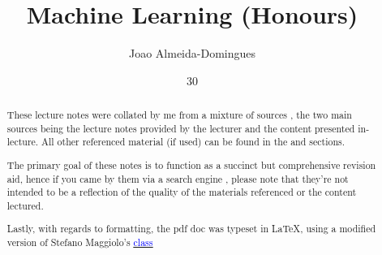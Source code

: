 \documentclass[english,course]{Notes}
\title{Machine Learning (Honours)}
\author{Joao Almeida-Domingues}
\date{30}{09}{2020}
\begin{document}

\begin{abstract}
	\par{These lecture notes were collated by me from a mixture of sources , the two main sources being the lecture notes provided by the lecturer and the 
content presented in-lecture. All other referenced material (if used) can be found in the  and  sections.}
	\par{The primary goal of these notes is to function as a succinct but comprehensive revision aid, hence if you came by them via a search engine , please note 
that they're not intended to be a reflection of the quality of the materials referenced or the content lectured.}
	\par{Lastly, with regards to formatting, the pdf doc was typeset in \LaTeX , using a modified version of Stefano Maggiolo's \href{http://blog.poormansmath.net/
latex-class-for-lecture-notes/}{\underline{\textcolor{blue}{class}}}}
\end{abstract}
\newpage





\newpage
\nocite{*}
\printbibliography

\end{document}
